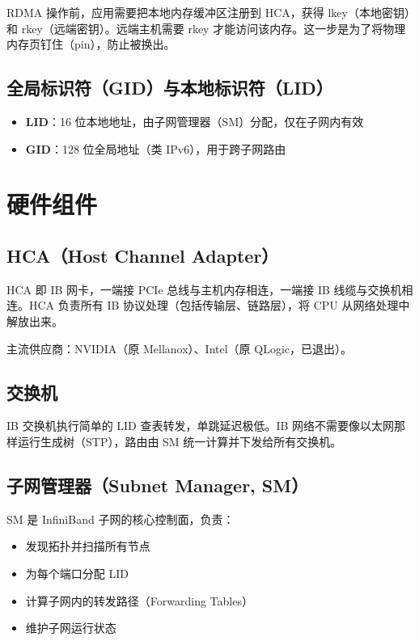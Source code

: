 RDMA 操作前，应用需要把本地内存缓冲区注册到 HCA，获得 lkey（本地密钥）和 rkey（远端密钥）。远端主机需要 rkey 才能访问该内存。这一步是为了将物理内存页钉住（pin），防止被换出。

\subsection{全局标识符（GID）与本地标识符（LID）}

\begin{itemize}
  \item \textbf{LID}：16 位本地地址，由子网管理器（SM）分配，仅在子网内有效
  \item \textbf{GID}：128 位全局地址（类 IPv6），用于跨子网路由
\end{itemize}

\section{硬件组件}

\subsection{HCA（Host Channel Adapter）}

HCA 即 IB 网卡，一端接 PCIe 总线与主机内存相连，一端接 IB 线缆与交换机相连。HCA 负责所有 IB 协议处理（包括传输层、链路层），将 CPU 从网络处理中解放出来。

主流供应商：NVIDIA（原 Mellanox）、Intel（原 QLogic，已退出）。

\subsection{交换机}

IB 交换机执行简单的 LID 查表转发，单跳延迟极低。IB 网络不需要像以太网那样运行生成树（STP），路由由 SM 统一计算并下发给所有交换机。

\subsection{子网管理器（Subnet Manager, SM）}

SM 是 InfiniBand 子网的核心控制面，负责：
\begin{itemize}
  \item 发现拓扑并扫描所有节点
  \item 为每个端口分配 LID
  \item 计算子网内的转发路径（Forwarding Tables）
  \item 维护子网运行状态
\end{itemize}

